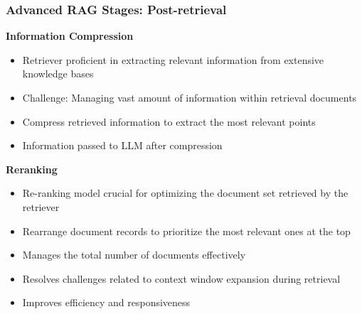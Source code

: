 \begin{frame}[fragile]\frametitle{Advanced RAG Stages: Post-retrieval}
\textbf{Information Compression}
  \begin{itemize}
    \item Retriever proficient in extracting relevant information from extensive knowledge bases
    \item Challenge: Managing vast amount of information within retrieval documents
    \item Compress retrieved information to extract the most relevant points
    \item Information passed to LLM after compression
  \end{itemize}
\textbf{Reranking}
  \begin{itemize}
    \item Re-ranking model crucial for optimizing the document set retrieved by the retriever
    \item Rearrange document records to prioritize the most relevant ones at the top
    \item Manages the total number of documents effectively
    \item Resolves challenges related to context window expansion during retrieval
    \item Improves efficiency and responsiveness
  \end{itemize}
\end{frame}





